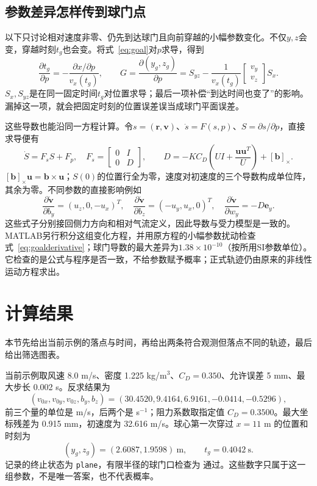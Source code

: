 \documentclass[11pt,a4paper,UTF8,fontset=windows]{ctexart}
\begin{document}
\subsection{参数差异怎样传到球门点}
以下只讨论相对速度非零、仍先到达球门且向前穿越的小幅参数变化。不仅$y,z$会变，穿越时刻$t_g$也会变。将式~\eqref{eq:goal}对$p$求导，得到
\begin{equation}
\frac{\partial t_g}{\partial p}=-\frac{\partial x/\partial p}{v_x(t_g)},\qquad
G=\frac{\partial(y_g,z_g)}{\partial p}
=S_{yz}-\frac{1}{v_x(t_g)}\begin{bmatrix}v_y\\v_z\end{bmatrix}S_x.
\label{eq:goalderivative}
\end{equation}
$S_x,S_{yz}$是在同一固定时间$t_g$对位置求导；最后一项补偿“到达时间也变了”的影响。漏掉这一项，就会把固定时刻的位置误差误当成球门平面误差。

这些导数也能沿同一方程计算。令$s=(\mathbf r,\mathbf v)$、$\dot s=F(s,p)$、$S=\partial s/\partial p$，直接求导便有
\begin{equation}
\dot S=F_sS+F_p,\quad
F_s=\begin{bmatrix}0&I\\0&D\end{bmatrix},\qquad
D=-KC_D\left(UI+\frac{\mathbf u\mathbf u^T}{U}\right)+[\mathbf b]_\times.
\end{equation}
$[\mathbf b]_\times\mathbf u=\mathbf b\times\mathbf u$；$S(0)$的位置行全为零，速度对初速度的三个导数构成单位阵，其余为零。不同参数的直接影响例如
\begin{equation}
\frac{\partial\dot{\mathbf v}}{\partial b_y}=(u_z,0,-u_x)^T,\quad
\frac{\partial\dot{\mathbf v}}{\partial b_z}=(-u_y,u_x,0)^T,\quad
\frac{\partial\dot{\mathbf v}}{\partial w_y}=-D\mathbf e_y.
\end{equation}
这些式子分别接回侧力方向和相对气流定义，因此导数与受力模型是一致的。MATLAB另行积分这组变化方程，并用原方程的小幅参数扰动检查式~\eqref{eq:goalderivative}；球门导数的最大差异为$1.38\times 10^{-10}$（按所用SI参数单位）。它检查的是公式与程序是否一致，不给参数赋予概率；正式轨迹仍由原来的非线性运动方程求出。


\section{计算结果}
本节先给出当前示例的落点与时间，再给出两条符合观测但落点不同的轨迹，最后给出筛选图表。

当前示例取风速 8.0 m/s、密度 1.225 kg/m$^3$、$C_D=0.350$、允许误差 5 mm、最大步长 0.002 s。反求结果为
\begin{equation}
(v_{0x},v_{0y},v_{0z},b_y,b_z)=(30.4520, 9.4164, 6.9161, -0.0414, -0.5296),
\end{equation}
前三个量的单位是 m/s，后两个是 s$^{-1}$；阻力系数取指定值 $C_D=0.3500$。最大坐标残差为 0.915 mm，初速度为 32.616 m/s。球心第一次穿过 $x=11$ m 的位置和时刻为
\begin{equation}
(y_g,z_g)=(2.6087,1.9598)\ \mathrm m,
\qquad t_g=0.4042\ \mathrm s.
\end{equation}
记录的终止状态为 \texttt{plane}，有限半径的球门口检查为 通过。这些数字只属于这一组参数，不是唯一答案，也不代表概率。
\end{document}
